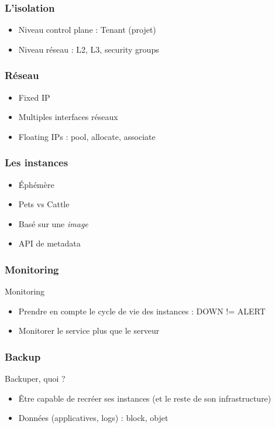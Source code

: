   \begin{frame}
    \frametitle{L'isolation}
    \begin{itemize}
      \item Niveau control plane : Tenant (projet)
      \item Niveau réseau : L2, L3, security groups
    \end{itemize}
  \end{frame}

  \begin{frame}
    \frametitle{Réseau}
    \begin{itemize}
      \item Fixed IP
      \item Multiples interfaces réseaux
      \item Floating IPs : pool, allocate, associate
    \end{itemize}
  \end{frame}

  \begin{frame}
    \frametitle{Les instances}
    \begin{itemize}
      \item Éphémère
      \item Pets vs Cattle
      \item Basé sur une \textit{image}
      \item API de metadata
    \end{itemize}
  \end{frame}

  \begin{frame}
    \frametitle{Monitoring}
    Monitoring
    \begin{itemize}
      \item Prendre en compte le cycle de vie des instances : DOWN != ALERT
      \item Monitorer le service plus que le serveur
    \end{itemize}
  \end{frame}

  \begin{frame}
    \frametitle{Backup}
    Backuper, quoi ?
    \begin{itemize}
      \item Être capable de recréer ses instances (et le reste de son infrastructure)
      \item Données (applicatives, logs) : block, objet
    \end{itemize}
  \end{frame}
